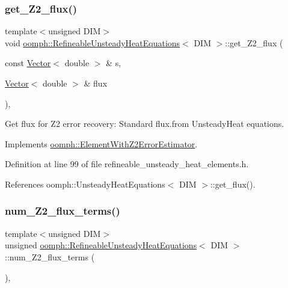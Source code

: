 \subsubsection{\texorpdfstring{get\+\_\+\+Z2\+\_\+flux()}{get\_Z2\_flux()}}
{\footnotesize\ttfamily template$<$unsigned D\+IM$>$ \\
void \hyperlink{classoomph_1_1RefineableUnsteadyHeatEquations}{oomph\+::\+Refineable\+Unsteady\+Heat\+Equations}$<$ D\+IM $>$\+::get\+\_\+\+Z2\+\_\+flux (\begin{DoxyParamCaption}\item[{const \hyperlink{classoomph_1_1Vector}{Vector}$<$ double $>$ \&}]{s,  }\item[{\hyperlink{classoomph_1_1Vector}{Vector}$<$ double $>$ \&}]{flux }\end{DoxyParamCaption})\hspace{0.3cm}{\ttfamily [inline]}, {\ttfamily [virtual]}}



Get \textquotesingle{}flux\textquotesingle{} for Z2 error recovery\+: Standard flux.\+from Unsteady\+Heat equations. 



Implements \hyperlink{classoomph_1_1ElementWithZ2ErrorEstimator_a5688ff5f546d81771cabad82ca5a7556}{oomph\+::\+Element\+With\+Z2\+Error\+Estimator}.



Definition at line 99 of file refineable\+\_\+unsteady\+\_\+heat\+\_\+elements.\+h.



References oomph\+::\+Unsteady\+Heat\+Equations$<$ D\+I\+M $>$\+::get\+\_\+flux().

\mbox{\label{classoomph_1_1RefineableUnsteadyHeatEquations_acb105ac90a3d3f5c2887f3073db8782b}} 
\subsubsection{\texorpdfstring{num\+\_\+\+Z2\+\_\+flux\+\_\+terms()}{num\_Z2\_flux\_terms()}}
{\footnotesize\ttfamily template$<$unsigned D\+IM$>$ \\
unsigned \hyperlink{classoomph_1_1RefineableUnsteadyHeatEquations}{oomph\+::\+Refineable\+Unsteady\+Heat\+Equations}$<$ D\+IM $>$\+::num\+\_\+\+Z2\+\_\+flux\+\_\+terms (\begin{DoxyParamCaption}{ }\end{DoxyParamCaption})\hspace{0.3cm}{\ttfamily [inline]}, {\ttfamily [virtual]}}



